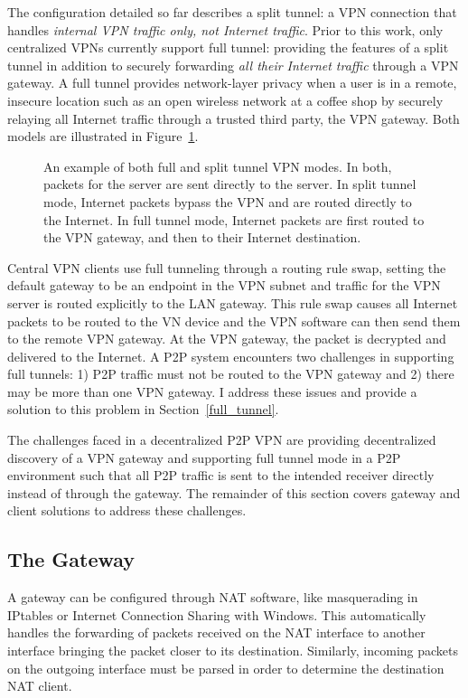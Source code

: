 The configuration detailed so far describes a split tunnel: a VPN connection
that handles \emph{internal VPN traffic only, not Internet traffic}.  Prior to
this work, only centralized VPNs currently support full tunnel: providing the
features of a split tunnel in addition to securely forwarding \emph{all their
Internet traffic} through a VPN gateway.  A full tunnel provides network-layer
privacy when a user is in a remote, insecure location such as an open wireless
network at a coffee shop by securely relaying all Internet traffic through a
trusted third party, the VPN gateway.  Both models are illustrated in
Figure~\ref{fig:tunnel}.

\begin{figure}
\centering
{}
\caption[An example of both full and split tunnel VPN modes]{An example of both
full and split tunnel VPN modes.  In both, packets for the server are sent
directly to the server.  In split tunnel mode, Internet packets bypass the VPN
and are routed directly to the Internet.  In full tunnel mode, Internet packets
are first routed to the VPN gateway, and then to their Internet destination.}
\label{fig:tunnel}
\end{figure}

Central VPN clients use full tunneling through a routing rule swap, setting the
default gateway to be an endpoint in the VPN subnet and traffic for the VPN
server is routed explicitly to the LAN gateway.  This rule swap causes all
Internet packets to be routed to the VN device and the VPN software can then
send them to the remote VPN gateway.  At the VPN gateway, the packet is
decrypted and delivered to the Internet.  A P2P system encounters two
challenges in supporting full tunnels:  1) P2P traffic must not be routed to
the VPN gateway and 2) there may be more than one VPN gateway.  I address these
issues and provide a solution to this problem in Section~\ref{full_tunnel}.

The challenges faced in a decentralized P2P VPN are providing decentralized
discovery of a VPN gateway and supporting full tunnel mode in a P2P environment
such that all P2P traffic is sent to the intended receiver directly instead of
through the gateway.  The remainder of this section covers gateway and
client solutions to address these challenges.

\subsection{The Gateway}
\label{the_gateway}
A gateway can be configured through NAT software, like masquerading in IPtables
or Internet Connection Sharing with Windows.  This automatically handles the
forwarding of packets received on the NAT interface to another interface
bringing the packet closer to its destination.  Similarly, incoming packets
on the outgoing interface must be parsed in order to determine the destination
NAT client.

